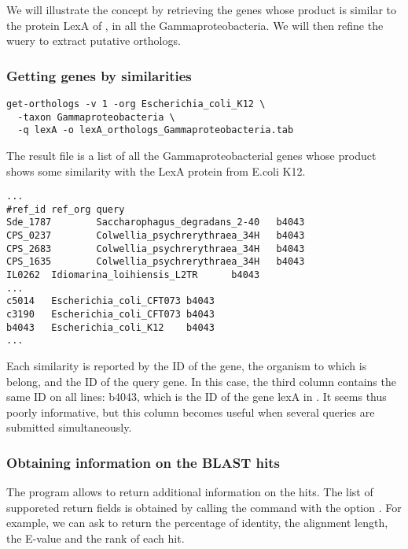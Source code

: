 We will illustrate the concept by retrieving the genes whose product
is similar to the protein LexA of , in
all the Gammaproteobacteria. We will then refine the wuery to extract
putative orthologs.

\subsubsection{Getting genes by similarities}

\begin{small}
\begin{verbatim}
get-orthologs -v 1 -org Escherichia_coli_K12 \
  -taxon Gammaproteobacteria \
  -q lexA -o lexA_orthologs_Gammaproteobacteria.tab
\end{verbatim}
\end{small}

The result file is a list of all the Gammaproteobacterial genes whose
product shows some similarity with the LexA protein from E.coli K12.  

\begin{scriptsize}
\begin{verbatim}
...
#ref_id ref_org query
Sde_1787        Saccharophagus_degradans_2-40   b4043
CPS_0237        Colwellia_psychrerythraea_34H   b4043
CPS_2683        Colwellia_psychrerythraea_34H   b4043
CPS_1635        Colwellia_psychrerythraea_34H   b4043
IL0262  Idiomarina_loihiensis_L2TR      b4043
...
c5014   Escherichia_coli_CFT073 b4043
c3190   Escherichia_coli_CFT073 b4043
b4043   Escherichia_coli_K12    b4043
...
\end{verbatim}
\end{scriptsize}

Each similarity is reported by the ID of the gene, the organism to
which is belong, and the ID of the query gene. In this case, the third
column contains the same ID on all lines: b4043, which is the ID of
the gene lexA in \organism{Escherichia coli K12}. It seems thus poorly
informative, but this column becomes useful when several queries are
submitted simultaneously.

\subsubsection{Obtaining information on the BLAST hits}

The program  allows to return additional
information on the hits. The list of supporeted return fields is
obtained by calling the command with the option \option{-help}. For
example, we can ask to return the percentage of identity, the
alignment length, the E-value and the rank of each hit.

